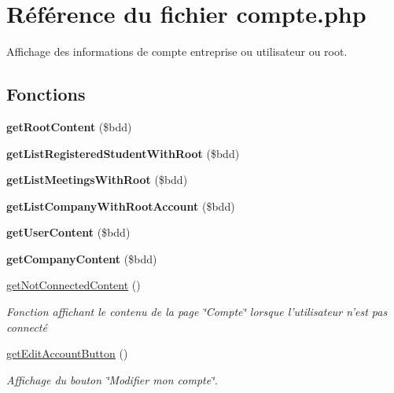 \hypertarget{compte_8php}{\section{Référence du fichier compte.\-php}
\label{compte_8php}
}


Affichage des informations de compte entreprise ou utilisateur ou root.  


\subsection*{Fonctions}
\begin{DoxyCompactItemize}
\item 
\hypertarget{compte_8php_a093efb957d6e3be19d97433ce9722079}{{\bfseries get\-Root\-Content} (\$bdd)}\label{compte_8php_a093efb957d6e3be19d97433ce9722079}

\item 
\hypertarget{compte_8php_aea6f5f0cc23336c71d72b70195fd9c00}{{\bfseries get\-List\-Registered\-Student\-With\-Root} (\$bdd)}\label{compte_8php_aea6f5f0cc23336c71d72b70195fd9c00}

\item 
\hypertarget{compte_8php_ae8f23e4ce9315fc7937248e12b8c507b}{{\bfseries get\-List\-Meetings\-With\-Root} (\$bdd)}\label{compte_8php_ae8f23e4ce9315fc7937248e12b8c507b}

\item 
\hypertarget{compte_8php_a5c99ac63f4b11e48badb80c8b0b4c060}{{\bfseries get\-List\-Company\-With\-Root\-Account} (\$bdd)}\label{compte_8php_a5c99ac63f4b11e48badb80c8b0b4c060}

\item 
\hypertarget{compte_8php_a03d4a85f4571fbe928098f70594ef41c}{{\bfseries get\-User\-Content} (\$bdd)}\label{compte_8php_a03d4a85f4571fbe928098f70594ef41c}

\item 
\hypertarget{compte_8php_ae7495dbc87a3bbf1f9ed0d432164dded}{{\bfseries get\-Company\-Content} (\$bdd)}\label{compte_8php_ae7495dbc87a3bbf1f9ed0d432164dded}

\item 
\hyperlink{compte_8php_a6864a2cabe7ba32b7dbe321b7dd63553}{get\-Not\-Connected\-Content} ()
\begin{DoxyCompactList}\small\item\em Fonction affichant le contenu de la page \char`\"{}\-Compte\char`\"{} lorsque l'utilisateur n'est pas connecté \end{DoxyCompactList}\item 
\hyperlink{compte_8php_a18d7f27faf8419a21fd9f5e98f5e318e}{get\-Edit\-Account\-Button} ()
\begin{DoxyCompactList}\small\item\em Affichage du bouton \char`\"{}\-Modifier mon compte\char`\"{}. \end{DoxyCompactList}\end{DoxyCompactItemize}
